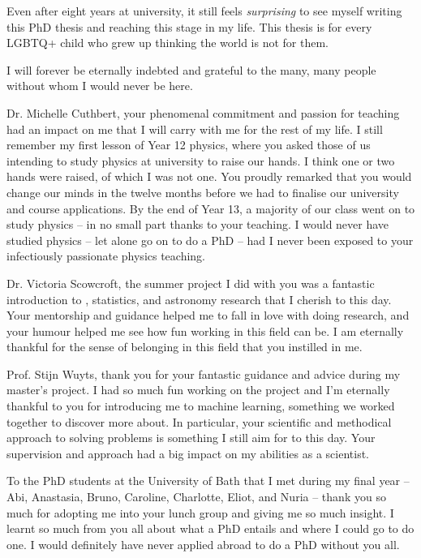 %
\label{sec:acknowledgement}

Even after eight years at university, it still feels \emph{surprising} to see myself writing this PhD thesis and reaching this stage in my life. This thesis is for every LGBTQ+ child who grew up thinking the world is not for them. %

I will forever be eternally indebted and grateful to the many, many people without whom I would never be here. %

Dr. Michelle Cuthbert, your phenomenal commitment and passion for teaching had an impact on me that I will carry with me for the rest of my life. I still remember my first lesson of Year 12 physics, where you asked those of us intending to study physics at university to raise our hands. I think one or two hands were raised, of which I was not one. You proudly remarked that you would change our minds in the twelve months before we had to finalise our university and course applications. By the end of Year 13, a majority of our class went on to study physics -- in no small part thanks to your teaching. I would never have studied physics -- let alone go on to do a PhD -- had I never been exposed to your infectiously passionate physics teaching.

Dr. Victoria Scowcroft, the summer project I did with you was a fantastic introduction to \gaia, statistics, and astronomy research that I cherish to this day. Your mentorship and guidance helped me to fall in love with doing research, and your humour helped me see how fun working in this field can be. I am eternally thankful for the sense of belonging in this field that you instilled in me.

Prof. Stijn Wuyts, thank you for your fantastic guidance and advice during my master's project. I had so much fun working on the project and I'm eternally thankful to you for introducing me to machine learning, something we worked together to discover more about. In particular, your scientific and methodical approach to solving problems is something I still aim for to this day. Your supervision and approach had a big impact on my abilities as a scientist.

To the PhD students at the University of Bath that I met during my final year -- Abi, Anastasia, Bruno, Caroline, Charlotte, Eliot, and Nuria -- thank you so much for adopting me into your lunch group and giving me so much insight. I learnt so much from you all about what a PhD entails and where I could go to do one. I would definitely have never applied abroad to do a PhD without you all.

